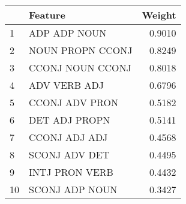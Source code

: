 \begin{tabular}{llr}
\toprule
{} &           Feature &  Weight \\
\midrule
1  &      ADP ADP NOUN &  0.9010 \\
2  &  NOUN PROPN CCONJ &  0.8249 \\
3  &  CCONJ NOUN CCONJ &  0.8018 \\
4  &      ADV VERB ADJ &  0.6796 \\
5  &    CCONJ ADV PRON &  0.5182 \\
6  &     DET ADJ PROPN &  0.5141 \\
7  &     CCONJ ADJ ADJ &  0.4568 \\
8  &     SCONJ ADV DET &  0.4495 \\
9  &    INTJ PRON VERB &  0.4432 \\
10 &    SCONJ ADP NOUN &  0.3427 \\
\bottomrule
\end{tabular}
